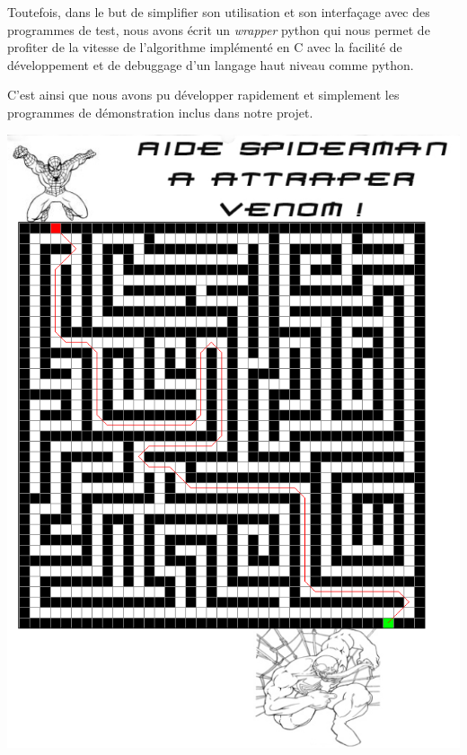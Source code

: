 \documentclass[a4paper,11pt]{article}
\begin{document}
Toutefois, dans le but de simplifier son utilisation et son interfaçage avec des
programmes de test, nous avons écrit un 
\emph{wrapper} python qui nous permet de profiter de la vitesse de l'algorithme
implémenté en C avec la facilité de développement 
et de debuggage d'un langage haut niveau comme python.

C'est ainsi que nous avons pu développer rapidement et simplement les programmes
de démonstration inclus dans notre projet.

\vspace{0.2cm}
\begin{center}
\includegraphics[width=0.5\linewidth]{screenshot/spiderman.png}
\end{center}
\end{document}
